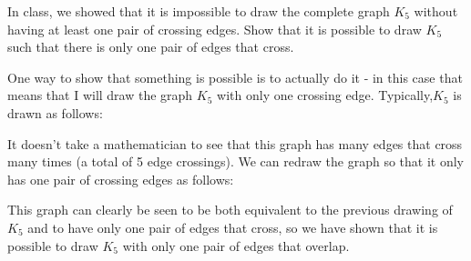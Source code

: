 \documentclass{article}
\begin{document}
\begin{problem} In class, we showed that it is impossible to draw the complete graph $K_5$ without having at least one pair of crossing edges. Show that it is possible to draw $K_5$ such that there is only one pair of edges that cross.
\end{problem}

\begin{solution}
One way to show that something is possible is to actually do it - in this case that means that I will draw the graph $K_5$ with only one crossing edge.  Typically,$K_5$ is drawn as follows:
\vskip 0.15in \noindent
{}
\vskip 0.15in \noindent
It doesn't take a mathematician to see that this graph has many edges that cross many times (a total of 5 edge crossings). We can redraw the graph so that it only has one pair of crossing edges as follows:
\vskip 0.15in \noindent
{}
\vskip 0.15in \noindent
This graph can clearly be seen to be both equivalent to the previous drawing of $K_5$ and to have only one pair of edges that cross, so we have shown that it is possible to draw $K_5$ with only one pair of edges that overlap.
\end{solution}
\end{document}
